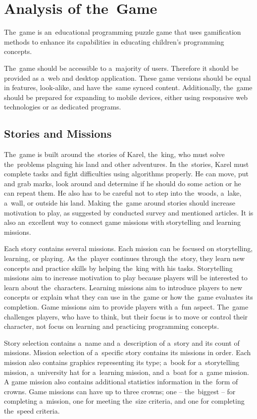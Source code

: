 \section{Analysis of the~Game}
\label{analysis:game}

The~game \emph{\myAppName} is an~educational programming puzzle game that uses gamification methods to enhance its capabilities in educating children's programming concepts.

The~game should be accessible to a~majority of users.
Therefore it should be provided as a~web and desktop application.
These game versions should be equal in features, look-alike, and have the~same synced content.
Additionally, the~game should be prepared for expanding to mobile devices, either using responsive web technologies or as dedicated programs.

\subsection{Stories and Missions}
\label{analysis:game:stories-and-missions}

The~game is built around the~stories of Karel, the~king, who must solve the~problems plaguing his land and other adventures.
In the~stories, Karel must complete tasks and fight difficulties using algorithms properly.
He can move, put and grab marks, look around and determine if he should do some action or he can repeat them.
He also has to be careful not to step into the~woods, a~lake, a~wall, or outside his land.
Making the~game around stories should increase motivation to play, as suggested by conducted survey and mentioned articles.
It is also an~excellent way to connect game missions with storytelling and learning missions.

Each story contains several missions.
Each mission can be focused on storytelling, learning, or playing.
As the~player continues through the~story, they learn new concepts and practice skills by helping the~king with his tasks.
Storytelling missions aim to increase motivation to play because players will be interested to learn about the~characters.
Learning missions aim to introduce players to new concepts or explain what they can use in the~game or how the~game evaluates its completion.
Game missions aim to provide players with a~fun aspect.
The~game challenges players, who have to think, but their focus is to move or control their character, not focus on learning and practicing programming concepts.

Story selection contains a~name and a~description of a~story and its count of missions.
Mission selection of a~specific story contains its missions in order.
Each mission also contains graphics representing its type; a~book for a~storytelling mission, a~university hat for a~learning mission, and a~boat for a~game mission.
A game mission also contains additional statistics information in the~form of crowns.
Game missions can have up to three crowns; one -- the~biggest -- for completing a~mission, one for meeting the~size criteria, and one for completing the~speed criteria.

